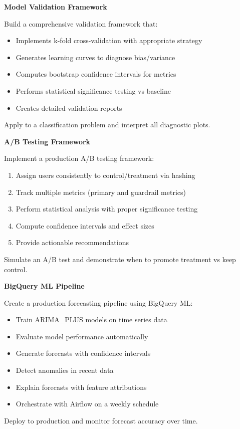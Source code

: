 \begin{exercise}
\textbf{Model Validation Framework}

Build a comprehensive validation framework that:
\begin{itemize}
    \item Implements k-fold cross-validation with appropriate strategy
    \item Generates learning curves to diagnose bias/variance
    \item Computes bootstrap confidence intervals for metrics
    \item Performs statistical significance testing vs baseline
    \item Creates detailed validation reports
\end{itemize}

Apply to a classification problem and interpret all diagnostic plots.
\end{exercise}

\begin{exercise}
\textbf{A/B Testing Framework}

Implement a production A/B testing framework:
\begin{enumerate}
    \item Assign users consistently to control/treatment via hashing
    \item Track multiple metrics (primary and guardrail metrics)
    \item Perform statistical analysis with proper significance testing
    \item Compute confidence intervals and effect sizes
    \item Provide actionable recommendations
\end{enumerate}

Simulate an A/B test and demonstrate when to promote treatment vs keep control.
\end{exercise}

\begin{exercise}
\textbf{BigQuery ML Pipeline}

Create a production forecasting pipeline using BigQuery ML:
\begin{itemize}
    \item Train ARIMA\_PLUS models on time series data
    \item Evaluate model performance automatically
    \item Generate forecasts with confidence intervals
    \item Detect anomalies in recent data
    \item Explain forecasts with feature attributions
    \item Orchestrate with Airflow on a weekly schedule
\end{itemize}

Deploy to production and monitor forecast accuracy over time.
\end{exercise}


